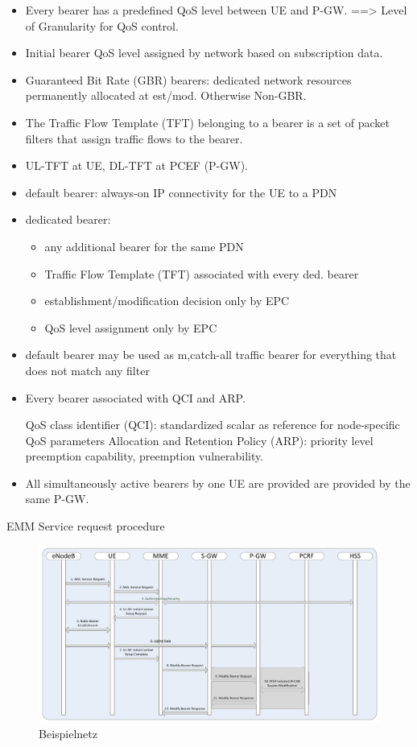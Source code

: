 \begin{itemize}
\item 	Every bearer has a predefined QoS level between UE and P-GW.
		==> Level of Granularity for QoS control.
\item	Initial bearer QoS level assigned by network based on subscription data.
\item	Guaranteed Bit Rate (GBR) bearers: dedicated network resources permanently allocated at est/mod. Otherwise Non-GBR.
\item	The Traffic Flow Template (TFT) belonging to a bearer is a set of packet filters that assign traffic flows to the bearer.
\item	UL-TFT at UE, DL-TFT at PCEF (P-GW).
\item 	default bearer: always-on IP connectivity for the UE to a PDN
\item	dedicated bearer:   
			\begin{itemize}
				\item any additional bearer for the same PDN
				\item Traffic Flow Template (TFT) associated with every ded. bearer
				\item establishment/modification decision only by EPC
				\item QoS level assignment only by EPC
			\end{itemize}

\item	default bearer may be used as {m,c}atch-all traffic bearer for everything that does not match any filter
\item	Every bearer associated with QCI and ARP.

QoS class identifier (QCI): standardized scalar as reference for node-specific QoS parameters
Allocation and Retention Policy (ARP): priority level preemption capability, preemption vulnerability.

\item	All simultaneously active bearers by one UE are provided are provided by the same P-GW.
\end{itemize}

EMM Service request procedure

\begin{figure}[htbp]
 \centering
 \includegraphics[width=1.0\textwidth]{images/3gpp/UE-service-request.pdf}
 \caption{Beispielnetz}\label{fig:3gpp-ueservicereq}
\end{figure}


